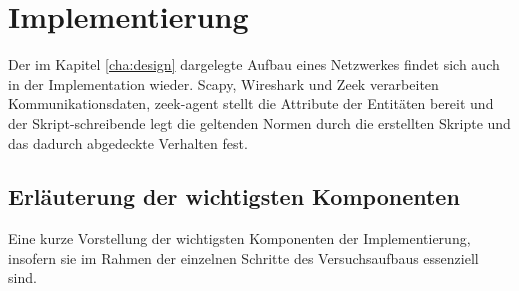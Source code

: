 \chapter{Implementierung}%
\label{cha:implementation}





Der im Kapitel \ref{cha:design} dargelegte Aufbau eines Netzwerkes findet sich auch in der Implementation wieder. Scapy, Wireshark und Zeek verarbeiten Kommunikationsdaten, zeek-agent stellt die Attribute der Entitäten bereit und der Skript-schreibende legt die geltenden Normen durch die erstellten Skripte und das dadurch abgedeckte Verhalten fest.
\section{Erläuterung der wichtigsten Komponenten}
Eine kurze Vorstellung der wichtigsten Komponenten der Implementierung, insofern sie im Rahmen der einzelnen Schritte des Versuchsaufbaus essenziell sind.

